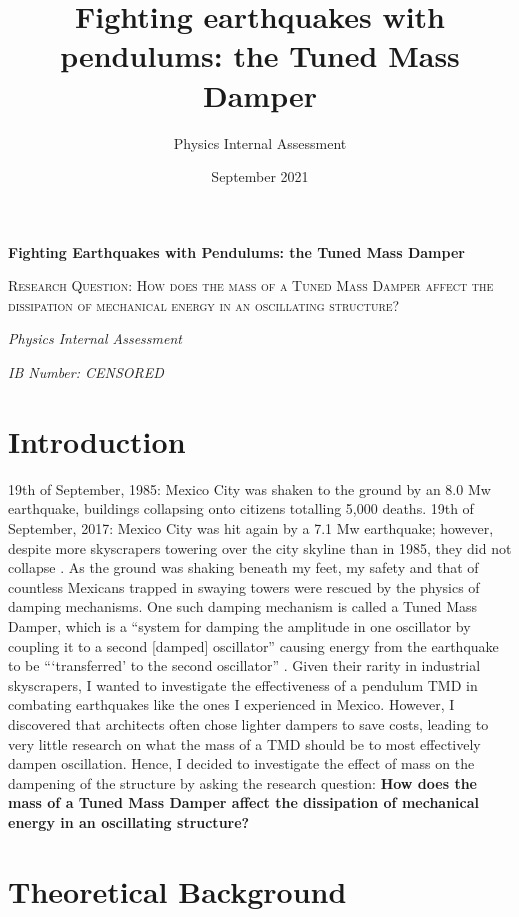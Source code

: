 \documentclass[11pt]{article}
\title{Fighting earthquakes with pendulums: the Tuned Mass Damper}
\author{Physics Internal Assessment}
\date{September 2021}
\begin{document}
\begin{titlepage}
	\centering
	{\huge\bfseries Fighting Earthquakes with Pendulums: the Tuned Mass Damper \par}
	\vspace{2cm}
	{\scshape\Large Research Question: How does the mass of a Tuned Mass Damper affect the dissipation of mechanical energy in an oscillating structure? \par}
	\vspace{1.5cm}
	{\Large\itshape Physics Internal Assessment \par}
	\vspace{0.5cm}
	{\Large\itshape IB Number: CENSORED \par}

	\vfill

\end{titlepage}


\clearpage
\section{Introduction}

19th of September, 1985: Mexico City was shaken to the ground by an 8.0 Mw earthquake, buildings collapsing onto citizens totalling 5,000 deaths. 19th of September, 2017: Mexico City was hit again by a 7.1 Mw earthquake; however, despite more skyscrapers towering over the city skyline than in 1985, they did not collapse \autocite{vance}. As the ground was shaking beneath my feet, my safety and that of countless Mexicans trapped in swaying towers were rescued by the physics of damping mechanisms. One such damping mechanism is called a Tuned Mass Damper, which is a “system for damping the amplitude in one oscillator by coupling it to a second [damped] oscillator” causing energy from the earthquake to be “‘transferred’ to the second oscillator” \autocite{orloff}. Given their rarity in industrial skyscrapers, I wanted to investigate the effectiveness of a pendulum TMD in combating earthquakes like the ones I experienced in Mexico. However, I discovered that architects often chose lighter dampers to save costs, leading to very little research on what the mass of a TMD should be to most effectively dampen oscillation. Hence, I decided to investigate the effect of mass on the dampening of the structure by asking the research question: \textbf{How does the mass of a Tuned Mass Damper affect the dissipation of mechanical energy in an oscillating structure?}

\section{Theoretical Background}
\end{document}
